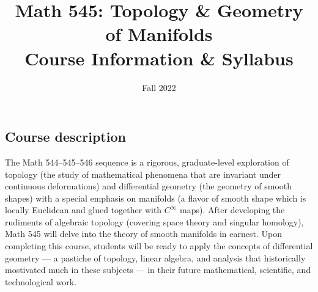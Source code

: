 \documentclass[11pt,twoside]{amsart}
\title{Math 545: Topology \& Geometry of Manifolds\\ Course Information \& Syllabus}
\author[Math 545:  Manifolds]{Fall 2022}
\begin{document}
\maketitle

\thispagestyle{empty}

\vspace{-.5cm}

\begin{center}
\end{center}

\smallskip

\subsection*{Course description}
The Math 544--545--546 sequence is a rigorous, graduate-level exploration of topology (the study of mathematical phenomena that are invariant under continuous deformations) and differential geometry (the geometry of smooth shapes) with a special emphasis on manifolds (a flavor of smooth shape which is locally Euclidean and glued together with $C^\infty$ maps). After developing the rudiments of algebraic topology (covering space theory and singular homology), Math 545 will delve into the theory of smooth manifolds in earnest. Upon completing this course, students will be ready to apply the concepts of differential geometry --- a pastiche of topology, linear algebra, and analysis that historically mostivated much in these subjects --- in their future mathematical, scientific, and technological work.
\end{document}
